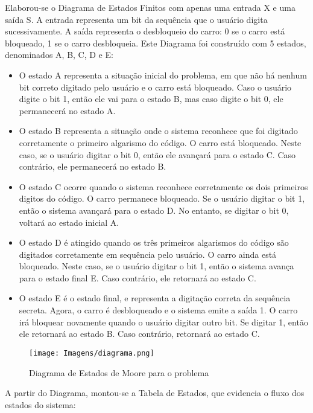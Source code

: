 \documentclass[12pt,a4paper]{article}
\begin{document}
Elaborou-se o Diagrama de Estados Finitos com apenas uma entrada X e uma saída S. A entrada representa um bit da sequência que o usuário digita sucessivamente. A saída representa o desbloqueio do carro: 0 se o carro está bloqueado, 1 se o carro desbloqueia. Este Diagrama foi construído com 5 estados, denominados A, B, C, D e E:
\begin{itemize}
\item O estado A representa a situação inicial do problema, em que não há nenhum bit correto digitado pelo usuário e o carro está bloqueado. Caso o usuário digite o bit 1, então ele vai para o estado B, mas caso digite o bit 0, ele permanecerá no estado A. 
\item O estado B representa a situação onde o sistema reconhece que foi digitado corretamente o primeiro algarismo do código. O carro está bloqueado. Neste caso, se o usuário digitar o bit 0, então ele avançará para o estado C. Caso contrário, ele permanecerá no estado B.
\item O estado C ocorre quando o sistema reconhece corretamente os dois primeiros digitos do código. O carro permanece bloqueado. Se o usuário digitar o bit 1, então o sistema avançará para o estado D. No entanto, se digitar o bit 0, voltará ao estado inicial A.
\item O estado D é atingido quando os três primeiros algarismos do código são digitados corretamente em sequência pelo usuário. O carro ainda está bloqueado. Neste caso, se o usuário digitar o bit 1, então o sistema avança para o estado final E. Caso contrário, ele retornará ao estado C.
\item O estado E é o estado final, e representa a digitação correta da sequência secreta. Agora, o carro é desbloqueado e o sistema emite a saída 1. O carro irá bloquear novamente quando o usuário digitar outro bit. Se digitar 1, então ele retornará ao estado B. Caso contrário, retornará ao estado C.  
\end{itemize}

\begin{figure}[h]
	\centering
	\texttt{[image: Imagens/diagrama.png]}
	\caption{Diagrama de Estados de Moore para o problema}
\end{figure}

A partir do Diagrama, montou-se a Tabela de Estados, que evidencia o fluxo dos estados do sistema:
\end{document}
